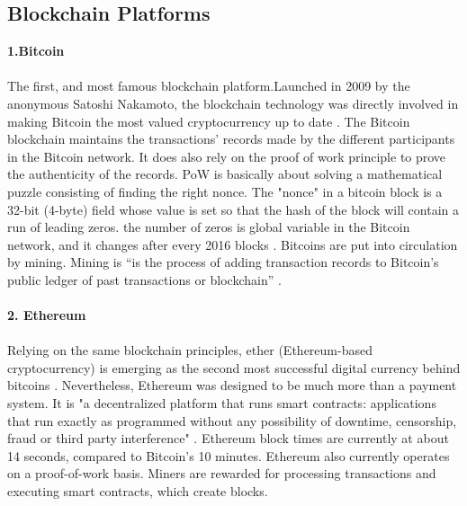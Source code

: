 \subsection{Blockchain Platforms}
\textbf{\large{1.Bitcoin}}\\
\\
The first, and most famous blockchain platform.\enspace Launched in 2009 by the anonymous Satoshi Nakamoto, the blockchain technology was directly involved in making Bitcoin the most valued cryptocurrency up to date \cite{value}. The Bitcoin blockchain maintains the transactions' records made by the different participants in the Bitcoin network. It does also rely on the proof of work principle to prove the authenticity of the records. PoW is basically about solving a mathematical puzzle consisting of finding the right nonce. The "nonce" in a bitcoin block is a 32-bit (4-byte) field whose value is set so that the hash of the block will contain a run of leading zeros. the number of zeros is global variable in the Bitcoin network, and it changes after every 2016 blocks \cite{bitwiki}. Bitcoins are put into circulation by mining. Mining is “is the process of adding transaction records to Bitcoin's public ledger of past transactions or blockchain” \cite{mining}.\\
\\
\textbf{\large{2. Ethereum}}\\ 
\\
Relying on the same blockchain principles, ether (Ethereum-based cryptocurrency) is emerging as the second most successful digital currency behind bitcoins \cite{value}. Nevertheless, Ethereum was designed to be much more than a payment system.  It is "a decentralized platform that runs smart contracts: applications that run exactly as programmed without any possibility of downtime, censorship, fraud or third party interference" \cite{ethereum}.  Ethereum block times are currently at about 14 seconds, compared to Bitcoin’s 10 minutes. Ethereum also currently operates on a proof-of-work basis. Miners are rewarded for processing transactions and executing smart contracts, which create blocks.
